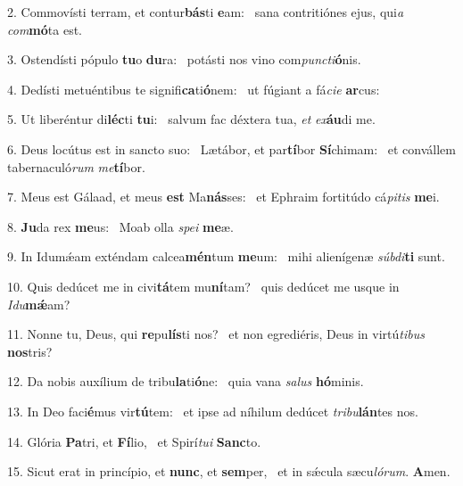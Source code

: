 2. Commovísti terram, et contur\textbf{bás}ti \textbf{e}am: \ast\  sana contritiónes ejus, qui\textit{a} \textit{com}\textbf{mó}ta est.\

3. Ostendísti pópulo \textbf{tu}o \textbf{du}ra: \ast\  potásti nos vino com\textit{punc}\textit{ti}\textbf{ó}nis.\

4. Dedísti metuéntibus te signifi\textbf{ca}ti\textbf{ó}nem: \ast\  ut fúgiant a fá\textit{ci}\textit{e} \textbf{ar}cus:\

5. Ut liberéntur di\textbf{léc}ti \textbf{tu}i: \ast\  salvum fac déxtera tua, \textit{et} \textit{ex}\textbf{áu}di me.\

6. Deus locútus est in sancto suo: \dag\  Lætábor, et par\textbf{tí}bor \textbf{Sí}chimam: \ast\  et convállem tabernaculó\textit{rum} \textit{me}\textbf{tí}bor.\

7. Meus est Gálaad, et meus \textbf{est} Ma\textbf{nás}ses: \ast\  et Ephraim fortitúdo cá\textit{pi}\textit{tis} \textbf{me}i.\

8. \textbf{Ju}da rex \textbf{me}us: \ast\  Moab olla \textit{spe}\textit{i} \textbf{me}æ.\

9. In Idumǽam exténdam calcea\textbf{mén}tum \textbf{me}um: \ast\  mihi alienígenæ \textit{súb}\textit{di}\textbf{ti} sunt.\

10. Quis dedúcet me in civi\textbf{tá}tem mu\textbf{ní}tam? \ast\  quis dedúcet me usque in \textit{I}\textit{du}\textbf{mǽ}am?\

11. Nonne tu, Deus, qui \textbf{re}pu\textbf{lís}ti nos? \ast\  et non egrediéris, Deus in virtú\textit{ti}\textit{bus} \textbf{nos}tris?\

12. Da nobis auxílium de tribu\textbf{la}ti\textbf{ó}ne: \ast\  quia vana \textit{sa}\textit{lus} \textbf{hó}minis.\

13. In Deo faci\textbf{é}mus vir\textbf{tú}tem: \ast\  et ipse ad níhilum dedúcet \textit{tri}\textit{bu}\textbf{lán}tes nos.\

14. Glória \textbf{Pa}tri, et \textbf{Fí}lio, \ast\  et Spirí\textit{tu}\textit{i} \textbf{Sanc}to.\

15. Sicut erat in princípio, et \textbf{nunc}, et \textbf{sem}per, \ast\  et in sǽcula sæcu\textit{ló}\textit{rum}. \textbf{A}men.\


